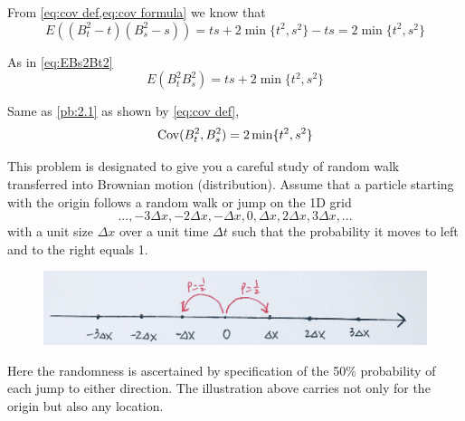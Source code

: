     \begin{subproblem}
        \item\label{pb:2.1}
        From \cref{eq:cov def,eq:cov formula} we know that
        \[E\left((B_t^2-t)(B_s^2-s)\right)=ts+2\min\{t^2,s^2\}-ts=2\min\{t^2,s^2\}\]

        \item
        As in \cref{eq:EBs2Bt2}
        \[E\left(B_t^2B_s^2\right)=ts+2\min\{t^2,s^2\}\]

        \item
        Same as \ref{pb:2.1} as shown by \cref{eq:cov def},
        \[\mathrm{Cov}(B_t^2,B_s^2)=2\min\{t^2,s^2\}\]
    \end{subproblem}

    \problem
    \begin{question}
        This problem is designated to give you a careful study of random walk
        transferred into Brownian motion (distribution).  Assume that a particle
        starting with the origin follows a random walk or jump on the 1D grid 
        \[...,-3\Delta x, -2\Delta x, -\Delta x, 0,\Delta x,2\Delta x,3\Delta x,...\]
        with a unit size $\Delta x$ over a unit time $\Delta t$ such that 
        the probability it moves to left and to the right equals 1.

        \begin{figure}[h!]
        \centering
        \includegraphics[width=\textwidth]{grid.png}\\
        \end{figure}
        
        Here the randomness is ascertained by specification of
        the 50\% probability of each jump to either direction. 
        The illustration above carries not only for the origin but also any location.



\end{question}
